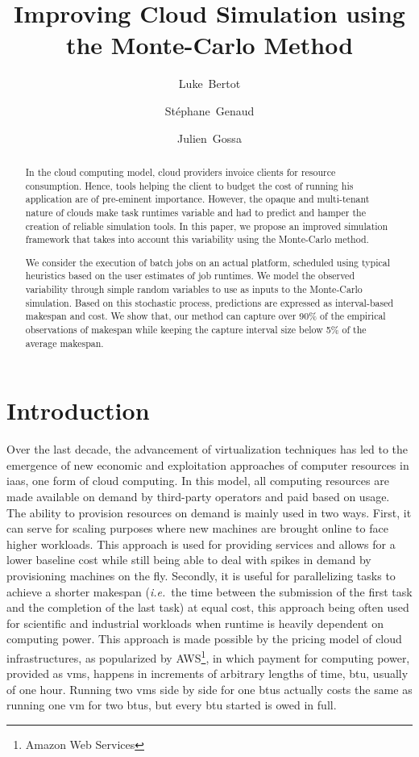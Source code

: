 \documentclass[]{llncs}
\title{Improving Cloud Simulation using the Monte-Carlo Method}
\author{Luke~Bertot
	\and Stéphane~Genaud 
	\and Julien~Gossa}
\institute{Icube-ICPS --- UMR 7357, Univeristé de Strasbourg, CNRS\\
		P\^ole API Blvd S. Bant, 67400 Illkirch%
	}
\begin{document}
\maketitle

\begin{abstract}
  In the  cloud computing  model, cloud providers  invoice clients  for resource
  consumption. Hence, tools helping the client to budget the cost of running his
  application are  of pre-eminent  importance. However, the opaque and 
  multi-tenant nature of clouds make task runtimes variable and had to predict
  and hamper the creation of reliable simulation tools. In this  paper, we 
  propose an improved simulation framework that takes into account this 
  variability using the Monte-Carlo method.

  We consider  the execution of  batch jobs on an actual platform, scheduled
  using typical  heuristics based on the user estimates  of job  runtimes.  We
  model  the observed  variability through  simple  random variables  to use  as
  inputs  to the  Monte-Carlo  simulation.  Based  on  this stochastic  process,
  predictions are expressed as interval-based  makespan and cost.  We show that,
  our method  can capture over  90\% of  the empirical observations  of makespan
  while keeping the capture interval size below 5\% of the average makespan.
\end{abstract}



\section{Introduction}


Over the  last decade, the advancement  of virtualization techniques has  led to
the emergence of new economic  and exploitation approaches of computer resources
in  \ac{iaas},  one form  of cloud  computing. In  this model,  all
computing resources  are made available  on demand by third-party  operators and
paid based  on usage.  The  ability to provision  resources on demand  is mainly
used in two ways.  First, it can serve for scaling purposes where new machines
are  brought online  to  face higher 
workloads.  This approach  is used  for  providing services  and allows  for a  lower
baseline  cost  while  still  being  able  to deal  with  spikes  in  demand  by
provisioning machines on the fly. Secondly, it is useful for parallelizing tasks
to achieve a shorter makespan (\textit{i.e.}\ the time between the submission of the first
task and the completion of the  last task)  at equal  cost, this  approach being  often used  for
scientific  and  industrial  workloads  when runtime  is  heavily  dependent  on
computing power.  This  approach is made possible by the  pricing model of cloud
infrastructures, as  popularized by AWS\footnote{Amazon Web  Services}, in which
payment  for computing  power, provided  as \acp{vm},  happens in  increments of
arbitrary lengths  of time, \ac{btu}, usually  of one hour. Running  two \acp{vm}
side by side for one \acp{btu} actually costs the same as running one \ac{vm} for two
\acp{btu}, but every \ac{btu} started is owed in full.
\end{document}
